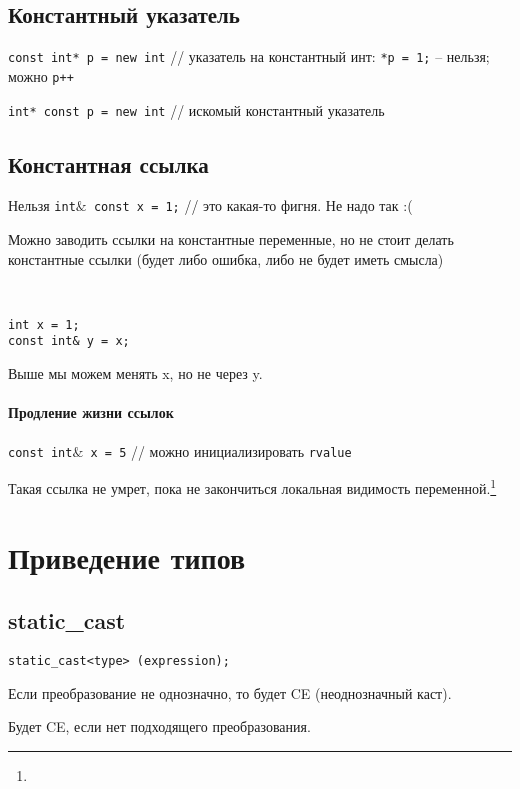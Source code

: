 \documentclass[12pt]{article}
\begin{document}
\subsection{Константный указатель}

\texttt{const int* p = new int} // указатель на константный инт: \texttt{*p = 1;} -- нельзя; можно \texttt{p++}

\texttt{int* const p = new int} // искомый константный указатель

\subsection{Константная ссылка}

Нельзя \texttt{int$\&$ const x = 1;} // это какая-то фигня. Не надо так :(

Можно заводить ссылки на константные переменные, но не стоит делать константные ссылки (будет либо ошибка, либо не будет иметь смысла)

\

\begin{lstlisting}
int x = 1;
const int& y = x;
\end{lstlisting}

Выше мы можем менять x, но не через y. 

\paragraph{Продление жизни ссылок}\texttt{const int$\&$ x = 5} // можно инициализировать \texttt{rvalue} 

Такая ссылка не умрет, пока не закончиться локальная видимость переменной.\footnote{} 

\section{Приведение типов}

\subsection{static\_cast}

\begin{lstlisting}
static_cast<type> (expression);
\end{lstlisting}

Если преобразование не однозначно, то будет CE (неоднозначный каст). 

Будет CE, если нет подходящего преобразования. 
\end{document}
